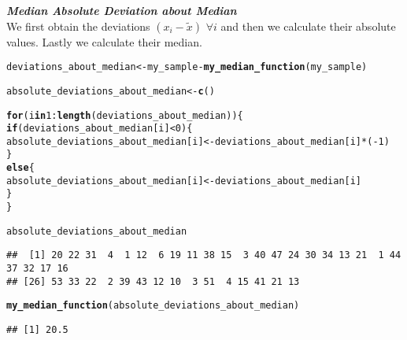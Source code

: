 \documentclass[11pt, a4paper]{article}\usepackage[]{graphicx}\usepackage[]{xcolor}
\makeatletter
\newcommand{\hlnum}[1]{\textcolor[rgb]{0.686,0.059,0.569}{#1}}%
\newcommand{\hlopt}[1]{\textcolor[rgb]{0,0,0}{#1}}%
\newcommand{\hldef}[1]{\textcolor[rgb]{0.345,0.345,0.345}{#1}}%
\newcommand{\hlkwa}[1]{\textcolor[rgb]{0.161,0.373,0.58}{\textbf{#1}}}%
\newcommand{\hlkwb}[1]{\textcolor[rgb]{0.69,0.353,0.396}{#1}}%
\newcommand{\hlkwd}[1]{\textcolor[rgb]{0.737,0.353,0.396}{\textbf{#1}}}%
\newenvironment{kframe}{%
 \def\at@end@of@kframe{}%
 \ifinner\ifhmode%
  \def\at@end@of@kframe{\end{minipage}}%
  \begin{minipage}{\columnwidth}%
 \fi\fi%
 \def\FrameCommand##1{\hskip\@totalleftmargin \hskip-\fboxsep
 \colorbox{shadecolor}{##1}\hskip-\fboxsep
     \hskip-\linewidth \hskip-\@totalleftmargin \hskip\columnwidth}%
 \MakeFramed {\advance\hsize-\width
   \@totalleftmargin\z@ \linewidth\hsize
   \@setminipage}}%
 {\par\unskip\endMakeFramed%
 \at@end@of@kframe}
\newenvironment{knitrout}{}{} %
\makeatother
\begin{document}
\vspace{0.5cm}

\faArrowAltCircleRight[regular] \textit{\textbf{Median Absolute Deviation about Median}} \\

We first obtain the deviations $(x_i - \widetilde{x}) \,\, \forall i$ and then we calculate their absolute values. Lastly we calculate their median.

\begin{knitrout}\footnotesize
{}\color{fgcolor}\begin{kframe}
\begin{alltt}
\hldef{deviations_about_median} \hlkwb{<-} \hldef{my_sample} \hlopt{-} \hlkwd{my_median_function}\hldef{(my_sample)}

\hldef{absolute_deviations_about_median} \hlkwb{<-} \hlkwd{c}\hldef{()}

\hlkwa{for} \hldef{(i} \hlkwa{in} \hlnum{1}\hlopt{:}\hlkwd{length}\hldef{(deviations_about_median)) \{}
  \hlkwa{if}\hldef{(deviations_about_median[i]} \hlopt{<} \hlnum{0}\hldef{)\{}
    \hldef{absolute_deviations_about_median[i]} \hlkwb{<-} \hldef{deviations_about_median[i]} \hlopt{*} \hldef{(}\hlopt{-}\hlnum{1}\hldef{)}
  \hldef{\}}
  \hlkwa{else}\hldef{\{}
    \hldef{absolute_deviations_about_median[i]} \hlkwb{<-} \hldef{deviations_about_median[i]}
  \hldef{\}}
\hldef{\}}
\end{alltt}
\end{kframe}
\end{knitrout}

\begin{knitrout}\footnotesize
{}\color{fgcolor}\begin{kframe}
\begin{alltt}
\hldef{absolute_deviations_about_median}
\end{alltt}
\begin{verbatim}
##  [1] 20 22 31  4  1 12  6 19 11 38 15  3 40 47 24 30 34 13 21  1 44 37 32 17 16
## [26] 53 33 22  2 39 43 12 10  3 51  4 15 41 21 13
\end{verbatim}
\end{kframe}
\end{knitrout}


\begin{knitrout}\footnotesize
{}\color{fgcolor}\begin{kframe}
\begin{alltt}
\hlkwd{my_median_function}\hldef{(absolute_deviations_about_median)}
\end{alltt}
\begin{verbatim}
## [1] 20.5
\end{verbatim}
\end{kframe}
\end{knitrout}
\end{document}

